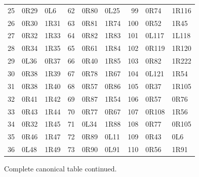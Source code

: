 \begin{center}
\begin{tabular}{rll@{\qquad}rll@{\qquad}rll}
25 & 0R29 & 0L6 & 62 & 0R80 & 0L25 & 99 & 0R74 & 1R116\\
26 & 0R30 & 1R31 & 63 & 0R81 & 1R74 & 100 & 0R52 & 1R45\\
27 & 0R32 & 1R33 & 64 & 0R82 & 1R83 & 101 & 0L117 & 1L118\\
28 & 0R34 & 1R35 & 65 & 0R61 & 1R84 & 102 & 0R119 & 1R120\\
29 & 0L36 & 0R37 & 66 & 0R40 & 1R85 & 103 & 0R82 & 1R222\\
30 & 0R38 & 1R39 & 67 & 0R78 & 1R67 & 104 & 0L121 & 1R54\\
31 & 0R38 & 1R40 & 68 & 0R57 & 0R86 & 105 & 0R37 & 1R105\\
32 & 0R41 & 1R42 & 69 & 0R87 & 1R54 & 106 & 0R57 & 0R76\\
33 & 0R43 & 1R44 & 70 & 0R77 & 0R67 & 107 & 0R108 & 1R56\\
34 & 0R32 & 1R45 & 71 & 0L34 & 1R88 & 108 & 0R77 & 0R105\\
35 & 0R46 & 1R47 & 72 & 0R89 & 0L11 & 109 & 0R43 & 0L6\\
36 & 0L48 & 1R49 & 73 & 0R90 & 0L91 & 110 & 0R56 & 1R91\\
\bottomrule
\end{tabular}
\end{center}
\clearpage
\noindent Complete canonical table continued.
